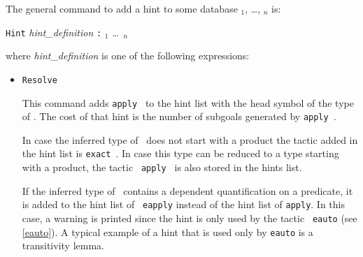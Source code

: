 \begin{coq_example*}
\begin{Variants}
\end{Variants}

The general
command to add a hint to some database \ident$_1$, \dots, \ident$_n$ is:
\begin{tabbing}
  \texttt{Hint} \textsl{hint\_definition} \texttt{:} \ident$_1$ \ldots\ \ident$_n$
\end{tabbing}
where {\sl hint\_definition} is one of the following expressions:

\begin{itemize}
\item \texttt{Resolve} {\term}

  This command adds {\tt apply {\term}} to the hint list
  with the head symbol of the type of \term. The cost of that hint is
  the number of subgoals generated by {\tt apply {\term}}.

  In case the inferred type of \term\ does not start with a product the
  tactic added in the hint list is {\tt exact {\term}}. In case this
  type can be reduced to a type starting with a product, the tactic {\tt
    apply {\term}} is also stored in the hints list.

  If the inferred type of \term\ contains a dependent
  quantification on a predicate, it is added to the hint list of {\tt
    eapply} instead of the hint list of {\tt apply}. In this case, a
  warning is printed since the hint is only used by the tactic {\tt
    eauto} (see \ref{eauto}). A typical example of a hint that is used
  only by \texttt{eauto} is a transitivity lemma.


\end{itemize}
\end{coq_example*}
